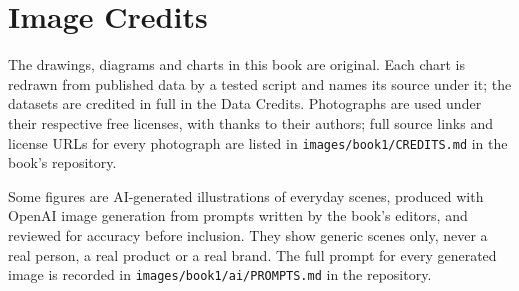 \chapter*{Image Credits}

The drawings, diagrams and charts in this book are original. Each chart is
redrawn from published data by a tested script and names its source under it;
the datasets are credited in full in the Data Credits.
Photographs are used under their respective free licenses, with thanks to
their authors; full source links and license URLs for every photograph are
listed in \texttt{images/book1/CREDITS.md} in the book's repository.

\bigskip
Some figures are AI-generated illustrations of everyday scenes, produced with
OpenAI image generation from prompts written by the book's editors, and
reviewed for accuracy before inclusion. They show generic scenes only, never a
real person, a real product or a real brand. The full prompt for every
generated image is recorded in \texttt{images/book1/ai/PROMPTS.md} in the
repository.

